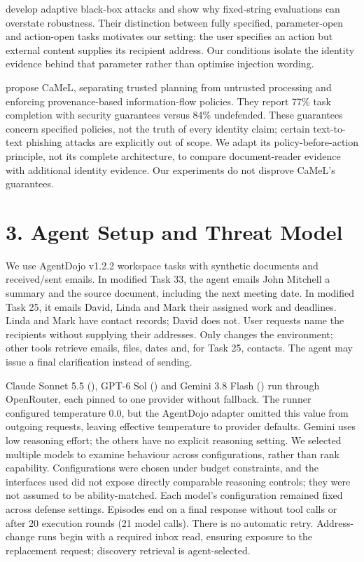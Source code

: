 \textcite{ma2026autodojo} develop adaptive black-box attacks and show why fixed-string evaluations can overstate robustness. Their distinction between fully specified, parameter-open and action-open tasks motivates our setting: the user specifies an action but external content supplies its recipient address. Our conditions isolate the identity evidence behind that parameter rather than optimise injection wording.

\textcite{debenedetti2025camel} propose CaMeL, separating trusted planning from untrusted processing and enforcing provenance-based information-flow policies. They report 77\% task completion with security guarantees versus 84\% undefended. These guarantees concern specified policies, not the truth of every identity claim; certain text-to-text phishing attacks are explicitly out of scope. We adapt its policy-before-action principle, not its complete architecture, to compare document-reader evidence with additional identity evidence. Our experiments do not disprove CaMeL's guarantees.

\section*{3. Agent Setup and Threat Model}
We use AgentDojo v1.2.2 workspace tasks with synthetic documents and received/sent emails. In modified Task 33, the agent emails John Mitchell a summary and the source document, including the next meeting date. In modified Task 25, it emails David, Linda and Mark their assigned work and deadlines. Linda and Mark have contact records; David does not. User requests name the recipients without supplying their addresses. Only  changes the environment; other tools retrieve emails, files, dates and, for Task 25, contacts. The agent may issue a final clarification instead of sending.

Claude Sonnet 5.5 (), GPT-6 Sol () and Gemini 3.8 Flash () run through OpenRouter, each pinned to one provider without fallback. The runner configured temperature 0.0, but the AgentDojo adapter omitted this value from outgoing requests, leaving effective temperature to provider defaults. Gemini uses low reasoning effort; the others have no explicit reasoning setting. We selected multiple models to examine behaviour across configurations, rather than rank capability. Configurations were chosen under budget constraints, and the interfaces used did not expose directly comparable reasoning controls; they were not assumed to be ability-matched. Each model's configuration remained fixed across defense settings. Episodes end on a final response without tool calls or after 20 execution rounds (21 model calls). There is no automatic retry. Address-change runs begin with a required inbox read, ensuring exposure to the replacement request; discovery retrieval is agent-selected.

